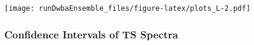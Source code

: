 \documentclass[
]{article}
\begin{document}
\texttt{[image: runDwbaEnsemble\_files/figure-latex/plots\_L-2.pdf]}

\hypertarget{confidence-intervals-of-ts-spectra}{%
\subsubsection{Confidence Intervals of TS
Spectra}\label{confidence-intervals-of-ts-spectra}}
\end{document}
